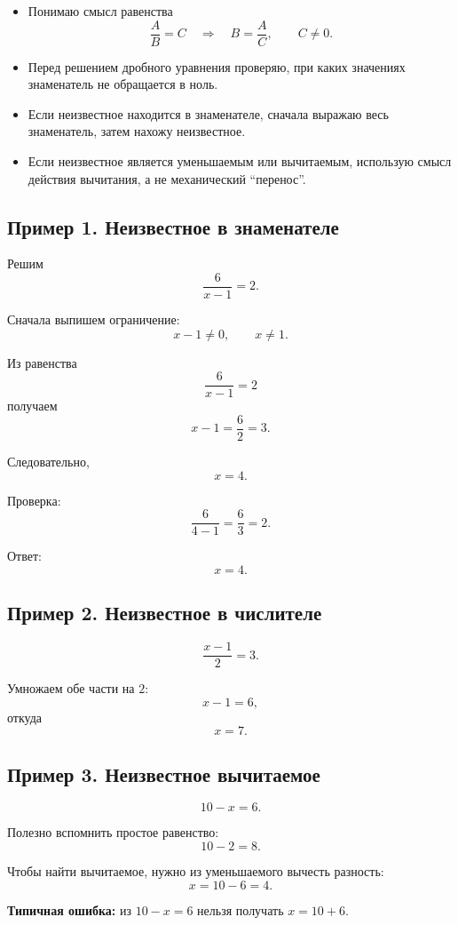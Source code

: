 \documentclass[a4paper,12pt]{article}
\newcommand{\checkitem}[1]{%
    \item[\textcolor{accent}{$\square$}] #1
}
\begin{document}
\begin{itemize}
    \checkitem{Понимаю смысл равенства
    \[
        \frac{A}{B}=C
        \quad\Longrightarrow\quad
        B=\frac{A}{C},
        \qquad C\ne0.
    \]}

    \checkitem{Перед решением дробного уравнения проверяю, при каких значениях знаменатель не обращается в ноль.}

    \checkitem{Если неизвестное находится в знаменателе, сначала выражаю весь знаменатель, затем нахожу неизвестное.}

    \checkitem{Если неизвестное является уменьшаемым или вычитаемым, использую смысл действия вычитания, а не механический ``перенос''.}
\end{itemize}

\subsection*{Пример 1. Неизвестное в знаменателе}

Решим
\[
    \frac{6}{x-1}=2.
\]

Сначала выпишем ограничение:
\[
    x-1\ne0,
    \qquad
    x\ne1.
\]

Из равенства
\[
    \frac{6}{x-1}=2
\]
получаем
\[
    x-1=\frac{6}{2}=3.
\]

Следовательно,
\[
    x=4.
\]

Проверка:
\[
    \frac{6}{4-1}=\frac63=2.
\]

Ответ:
\[
    \boxed{x=4}.
\]

\subsection*{Пример 2. Неизвестное в числителе}

\[
    \frac{x-1}{2}=3.
\]

Умножаем обе части на \(2\):
\[
    x-1=6,
\]
откуда
\[
    x=7.
\]

\subsection*{Пример 3. Неизвестное вычитаемое}

\[
    10-x=6.
\]

Полезно вспомнить простое равенство:
\[
    10-2=8.
\]

Чтобы найти вычитаемое, нужно из уменьшаемого вычесть разность:
\[
    x=10-6=4.
\]

\textbf{Типичная ошибка:}
из \(10-x=6\) нельзя получать \(x=10+6\).
\end{document}

